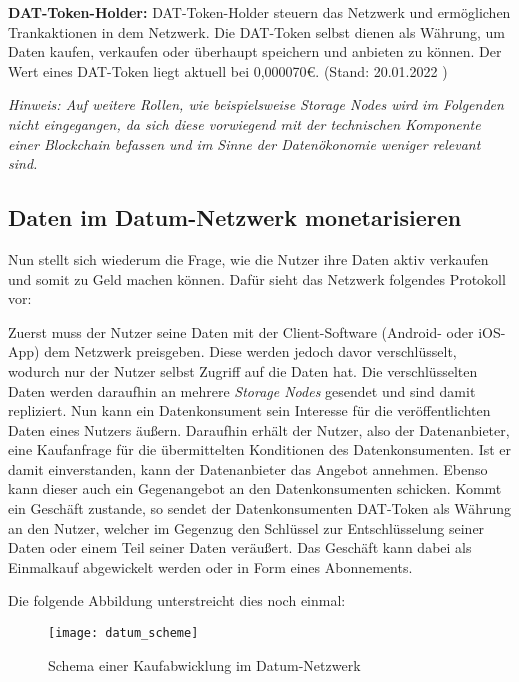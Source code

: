 \noindent \textbf{DAT-Token-Holder:} DAT-Token-Holder steuern das Netzwerk und ermöglichen Trankaktionen in dem Netzwerk. Die DAT-Token selbst dienen als Währung, um Daten kaufen, verkaufen oder überhaupt speichern und anbieten zu können. Der Wert eines DAT-Token liegt aktuell bei 0,000070€. (Stand: 20.01.2022 \cite{DAT_Token_price}) \newline

\noindent \textit{Hinweis: Auf weitere Rollen, wie beispielsweise Storage Nodes wird im Folgenden nicht eingegangen, da sich diese vorwiegend mit der technischen Komponente einer Blockchain befassen und im Sinne der Datenökonomie weniger relevant sind.}

\subsection{Daten im Datum-Netzwerk monetarisieren}
Nun stellt sich wiederum die Frage, wie die Nutzer ihre Daten aktiv verkaufen und somit zu Geld machen können. Dafür sieht das Netzwerk folgendes Protokoll vor:\newline

\noindent Zuerst muss der Nutzer seine Daten mit der Client-Software (Android- oder iOS-App) dem Netzwerk preisgeben. Diese werden jedoch davor verschlüsselt, wodurch nur der Nutzer selbst Zugriff auf die Daten hat. Die verschlüsselten Daten werden daraufhin an mehrere \textit{Storage Nodes} gesendet und sind damit repliziert. Nun kann ein Datenkonsument sein Interesse für die veröffentlichten Daten eines Nutzers äußern. Daraufhin erhält der Nutzer, also der Datenanbieter, eine Kaufanfrage für die übermittelten Konditionen des Datenkonsumenten. Ist er damit einverstanden, kann der Datenanbieter das Angebot annehmen. Ebenso kann dieser auch ein Gegenangebot an den Datenkonsumenten schicken. Kommt ein Geschäft zustande, so sendet der Datenkonsumenten DAT-Token als Währung an den Nutzer, welcher im Gegenzug den Schlüssel zur Entschlüsselung seiner Daten oder einem Teil seiner Daten veräußert.
Das Geschäft kann dabei als Einmalkauf abgewickelt werden oder in Form eines Abonnements. \cite{datum_2017} \newline

\noindent Die folgende Abbildung unterstreicht dies noch einmal:

\begin{figure}[!ht]
	\centering
	\texttt{[image: datum\_scheme]}
	\caption{Schema einer Kaufabwicklung im Datum-Netzwerk \cite{datum_2017}}
	\label{fig:datumScheme}
\end{figure}
